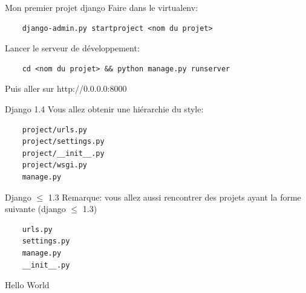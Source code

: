 \documentclass{beamer}
\begin{document}
\begin{frame}[fragile]{Mon premier projet django}
    Faire dans le virtualenv:
            \begin{verbatim}
    django-admin.py startproject <nom du projet>
            \end{verbatim}
    \pause
    Lancer le serveur de développement:
    \begin{verbatim}
    cd <nom du projet> && python manage.py runserver
    \end{verbatim}
    Puis aller sur http://0.0.0.0:8000
\end{frame}

\begin{frame}[fragile]{Django 1.4}
    Vous allez obtenir une hiérarchie du style:

\begin{verbatim}
    project/urls.py
    project/settings.py
    project/__init__.py
    project/wsgi.py
    manage.py
\end{verbatim}

\end{frame}

\begin{frame}[fragile]{Django $\leq$ 1.3}
    Remarque: vous allez aussi rencontrer des projets ayant la forme suivante (django $\leq$ 1.3)
    \begin{verbatim}
    urls.py
    settings.py
    manage.py
    __init__.py
    \end{verbatim}
\end{frame}

\begin{frame}[fragile]{}
\begin{LARGE}
\begin{center}
Hello World
\end{center}
\end{LARGE}
\end{frame}
\end{document}
